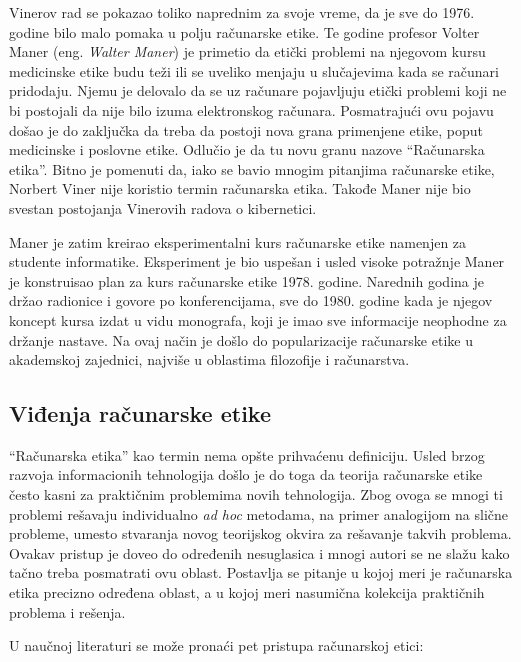 \documentclass[a4paper]{article}
\begin{document}
Vinerov rad se pokazao toliko naprednim za svoje vreme, da je sve do 1976. godine bilo malo pomaka u polju računarske etike. Te godine profesor Volter Maner (eng. \textit{Walter Maner}) je primetio da etički problemi na njegovom kursu medicinske etike budu teži ili se uveliko menjaju u slučajevima kada se računari pridodaju. Njemu je delovalo da se uz računare pojavljuju etički problemi koji ne bi postojali da nije bilo izuma elektronskog računara. Posmatrajući ovu pojavu došao je do zaključka da treba da postoji nova grana primenjene etike, poput medicinske i poslovne etike. Odlučio je da tu novu granu nazove ``Računarska etika''. Bitno je pomenuti da, iako se bavio mnogim pitanjima računarske etike, Norbert Viner nije koristio termin računarska etika. Takođe Maner nije bio svestan postojanja Vinerovih radova o kibernetici.

Maner je zatim kreirao eksperimentalni kurs računarske etike namenjen za studente informatike. Eksperiment je bio uspešan i usled visoke potražnje Maner je konstruisao plan za kurs računarske etike 1978. godine. Narednih godina je držao radionice i govore po konferencijama, sve do 1980. godine kada je njegov koncept kursa izdat u vidu monografa, koji je imao sve informacije neophodne za držanje nastave. Na ovaj način je došlo do popularizacije računarske etike u akademskoj zajednici, najviše u oblastima filozofije i računarstva.



\subsection{Viđenja računarske etike}
``Računarska etika'' kao termin nema opšte prihvaćenu definiciju. Usled brzog razvoja informacionih tehnologija došlo je do toga da teorija računarske etike često kasni za praktičnim problemima novih tehnologija. Zbog ovoga se mnogi ti problemi rešavaju individualno \textit{ad hoc} metodama, na primer analogijom na slične probleme, umesto stvaranja novog teorijskog okvira za rešavanje takvih problema. Ovakav pristup je doveo do određenih nesuglasica i mnogi autori se ne slažu kako tačno treba posmatrati ovu oblast. Postavlja se pitanje u kojoj meri je računarska etika precizno određena oblast, a u kojoj meri nasumična kolekcija praktičnih problema i rešenja.

U naučnoj literaturi se može pronaći pet pristupa računarskoj etici\cite{floridi}:
\end{document}
